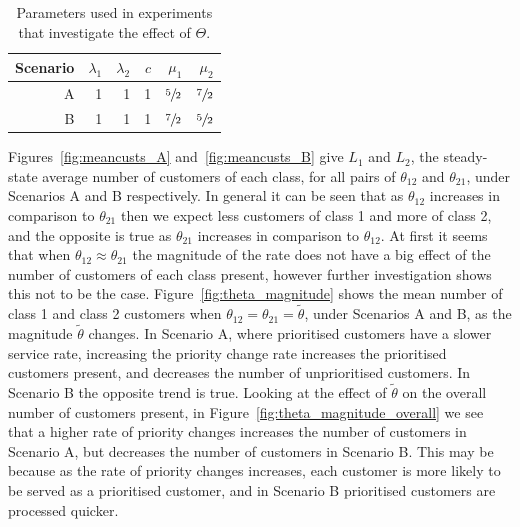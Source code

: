 \documentclass{article}
\begin{document}
\begin{table}
\begin{center}
\begin{tabular}{rrrrrr}
\toprule
Scenario & $\lambda_1$ & $\lambda_2$ & $c$ & $\mu_1$ & $\mu_2$ \\
\midrule
A & 1 & 1 & 1& $\sfrac{5}{2}$ & $\sfrac{7}{2}$\\ 
B & 1 & 1 & 1& $\sfrac{7}{2}$ & $\sfrac{5}{2}$\\
\bottomrule
\end{tabular}
\end{center}
\caption{Parameters used in experiments that investigate the effect of $\Theta$.}
\label{tbl:scenarios}
\end{table}

Figures~\ref{fig:meancusts_A} and~\ref{fig:meancusts_B} give $L_1$ and $L_2$,
the steady-state average number of customers of each class, for all pairs of
$\theta_{12}$ and $\theta_{21}$, under Scenarios A and B respectively. In
general it can be seen that as $\theta_{12}$ increases in comparison to
$\theta_{21}$ then we expect less customers of class 1 and more of class 2, and
the opposite is true as $\theta_{21}$ increases in comparison to $\theta_{12}$.
At first it seems that when $\theta_{12} \approx \theta_{21}$ the magnitude of
the rate does not have a big effect of the number of customers of each class
present, however further investigation shows this not to be the case.
Figure~\ref{fig:theta_magnitude} shows the mean number of class 1 and class 2
customers when $\theta_{12} = \theta_{21} = \tilde{\theta}$, under Scenarios A
and B, as the magnitude $\tilde{\theta}$ changes. In Scenario A, where
prioritised customers have a slower service rate, increasing the priority change
rate increases the prioritised customers present, and decreases the number of
unprioritised customers. In Scenario B the opposite trend is true. Looking at
the effect of $\tilde{\theta}$ on the overall number of customers present, in
Figure~\ref{fig:theta_magnitude_overall} we see that a higher rate of priority
changes increases the number of customers in Scenario A, but decreases the
number of customers in Scenario B. This may be because as the rate of priority
changes increases, each customer is more likely to be served as a prioritised
customer, and in Scenario B prioritised customers are processed quicker.
\end{document}
